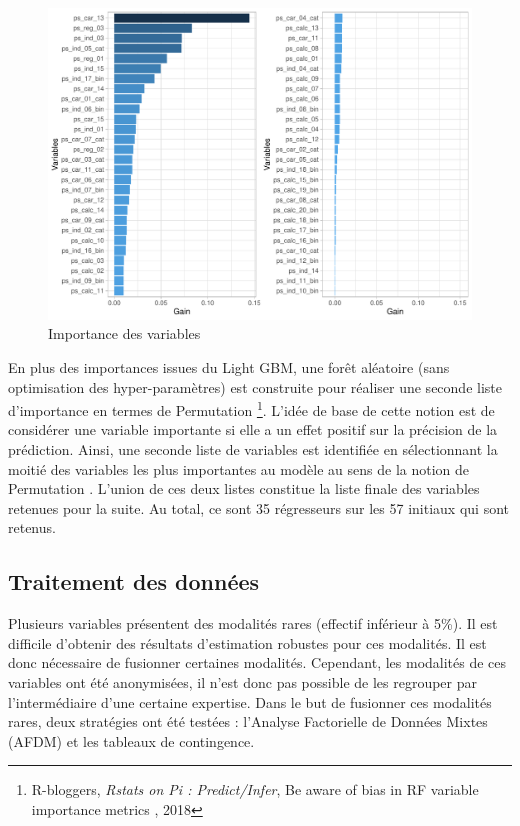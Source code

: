 \documentclass[french]{article}
\begin{document}
\begin{multicols}{2}
\begin{figure}[H] \centering
  \includegraphics[width = \columnwidth]{img/var_imp_lgb}
  \caption{Importance des variables}
\end{figure}

En plus des importances issues du Light GBM, une forêt aléatoire (sans optimisation des hyper-paramètres) est construite pour réaliser une seconde liste d'importance en termes de \og Permutation \fg{} \footnote{R-bloggers, \emph{Rstats on Pi : Predict/Infer}, \og Be aware of bias in RF variable importance metrics \fg, 2018}. L'idée de base de cette notion est de considérer une variable importante si elle a un effet positif sur la précision de la prédiction. Ainsi, une seconde liste de variables est identifiée en sélectionnant la moitié des variables les plus importantes au modèle au sens de la notion de \og Permutation \fg. L'union de ces deux listes constitue la liste finale des variables retenues pour la suite. Au total, ce sont 35 régresseurs sur les 57 initiaux qui sont retenus.

\subsection{Traitement des données}

Plusieurs variables présentent des modalités rares (effectif inférieur à 5\%). Il est difficile d'obtenir des résultats d'estimation robustes pour ces modalités. Il est donc nécessaire de fusionner certaines modalités. Cependant, les modalités de ces variables ont été anonymisées, il n'est donc pas possible de les regrouper par l'intermédiaire d'une certaine expertise. Dans le but de fusionner ces modalités rares, deux stratégies ont été testées :  l'Analyse Factorielle de Données Mixtes (AFDM) et les tableaux de contingence.


\end{multicols}
\end{document}
